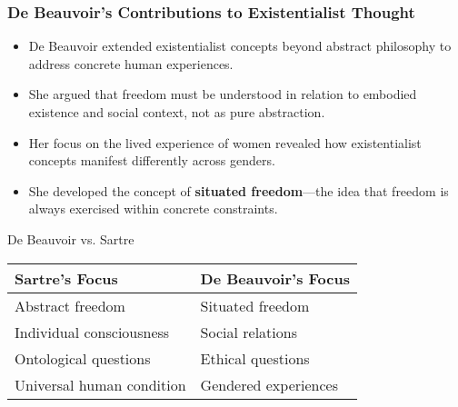 \documentclass[aspectratio=169]{beamer}
\begin{document}
		\begin{frame}
			\frametitle{De Beauvoir's Contributions to Existentialist Thought}
			\begin{itemize}
				\item De Beauvoir extended existentialist concepts beyond abstract philosophy to address concrete human experiences.
				\item She argued that freedom must be understood in relation to embodied existence and social context, not as pure abstraction.
				\item Her focus on the lived experience of women revealed how existentialist concepts manifest differently across genders.
				\item She developed the concept of \textbf{situated freedom}—the idea that freedom is always exercised within concrete constraints.
			\end{itemize}
			
			\begin{block}{De Beauvoir vs. Sartre}
				\begin{tabular}{p{0.45\textwidth} | p{}}
					\textbf{Sartre's Focus} & \textbf{De Beauvoir's Focus} \\
					\hline
					Abstract freedom & Situated freedom \\
					Individual consciousness & Social relations \\
					Ontological questions & Ethical questions \\
					Universal human condition & Gendered experiences \\
				\end{tabular}
			\end{block}
		\end{frame}
		
\end{document}
